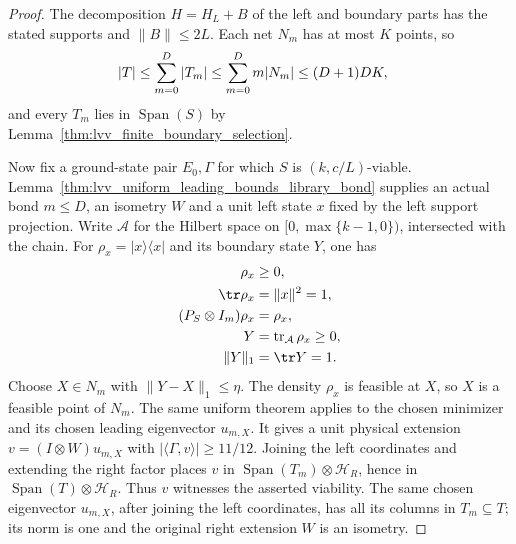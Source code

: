 \begin{proof}\leanok
    The decomposition $H=H_L+B$ of the left and boundary parts has the stated
    supports and $\|B\|\le2L$. Each net $N_m$ has at most $K$ points, so
    \begin{align}
        |T| & \le\sum_{m=0}^{D}|T_m|
        \le\sum_{m=0}^{D}m|N_m|\le(D+1)DK,\notag
    \end{align}
    and every $T_m$ lies in $\operatorname{Span}(S)$ by
    Lemma~\ref{thm:lvv_finite_boundary_selection}.

    Now fix a ground-state pair $E_0,\Gamma$ for which $S$ is
    $(k,c/L)$-viable. Lemma~\ref{thm:lvv_uniform_leading_bounds_library_bond}
    supplies an actual bond $m\le D$, an isometry $W$ and a unit left
    state $x$ fixed by the left support projection. Write $\mathcal A$
    for the Hilbert space on $\lbrack0,\max\{k-1,0\})$, intersected with the chain. For
    $\rho_x=|x\rangle\langle x|$ and its boundary state $Y$, one has
    \begin{align}
        \rho_x                 & \ge0,\notag                                      \\
        \tr\rho_x              & =\|x\|^2=1,\notag                                \\
        (P_S\otimes I_m)\rho_x & =\rho_x,\notag                                   \\
        Y                      & =\operatorname{tr}_{\mathcal A}\rho_x\ge0,\notag \\
        \|Y\|_1                & =\tr Y=1.\notag
    \end{align}
    Choose $X\in N_m$ with $\|Y-X\|_1\le\eta$. The density $\rho_x$ is
    feasible at $X$, so $X$ is a feasible point of $N_m$.
    The same uniform theorem applies to the chosen minimizer and its chosen
    leading eigenvector $u_{m,X}$. It gives
    a unit physical extension $v=(I\otimes W)u_{m,X}$ with
    $|\langle\Gamma,v\rangle|\ge11/12$.
    Joining the left coordinates and extending the right factor places
    $v$ in $\operatorname{Span}(T_m)\otimes\mathcal H_R$, hence in
    $\operatorname{Span}(T)\otimes\mathcal H_R$. Thus $v$ witnesses the
    asserted viability. The same chosen eigenvector $u_{m,X}$, after
    joining the left coordinates, has all its columns in $T_m\subseteq T$;
    its norm is one and the original right extension $W$ is an isometry.
\end{proof}

